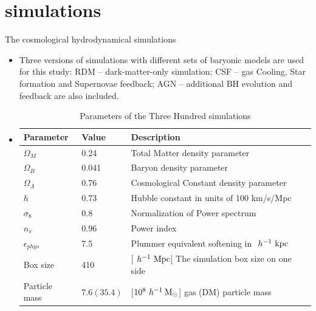\documentclass[aspectratio=43]{beamer}
\newcommand{\hMsun}{~h^{-1}\>{\rm M_\odot}}
\newcommand{\Mpc}{~h^{-1}~{\rm Mpc}}
\newcommand{\Kpc}{~h^{-1}~{\rm kpc}}
\begin{document}
\section{simulations}
\begin{frame}{The cosmological hydrodynamical simulations}
\begin{itemize}
    \item Three versions of simulations with different sets of baryonic models are used for this study: RDM -- dark-matter-only simulation; CSF -- gas Cooling, Star formation and Supernovae feedback; AGN -- additional BH evolution and feedback are also included.
    \item[]
      \begin{table}
        \fontsize{9}{9}\selectfont
        \caption{Parameters of the Three Hundred simulations}
        \begin{tabular}{lll}
          \hline
          Parameter& Value & Description\\
          \hline
          $\Omega_M$ & 0.24 & Total Matter density parameter\\
          $\Omega_B$ & 0.041 & Baryon density parameter\\
          $\Omega_\Lambda$ & 0.76 & Cosmological Constant density parameter\\
          $h$ & 0.73  & Hubble constant in units of 100 km/s/Mpc\\
          $\sigma_8$ & 0.8 & Normalization of Power spectrum\\
          $n_s$ & 0.96  & Power index\\
          $\epsilon_{phys}$ & 7.5 & Plummer equivalent softening in $\Kpc$ \\
          Box size & 410 & [$\Mpc$] The simulation box size on one side \\
          Particle mass & $7.6 (35.4) $ & [$10^8 \hMsun$] gas (DM) particle mass \\
          \hline
        \end{tabular}
      \end{table}
\end{itemize}
\end{frame}
\end{document}
